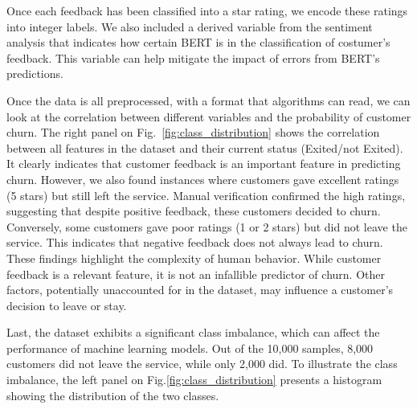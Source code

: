 \documentclass[12pt]{article}
\begin{document}
Once each feedback has been classified into a star rating, we encode these ratings into integer labels. We also included a derived variable from the sentiment analysis that indicates how certain BERT is in the classification of costumer's feedback. This variable can help mitigate the impact of errors from BERT's predictions.

Once the data is all preprocessed, with a format that algorithms can read, we can look at the correlation between different variables and the probability of customer churn. The right panel on Fig.~\ref{fig:class_distribution} shows the correlation between all features in the dataset and their current status (Exited/not Exited). It clearly indicates that customer feedback is an important feature in predicting churn. However, we also found instances where customers gave excellent ratings (5 stars) but still left the service. Manual verification confirmed the high ratings, suggesting that despite positive feedback, these customers decided to churn. Conversely, some customers gave poor ratings (1 or 2 stars) but did not leave the service. This indicates that negative feedback does not always lead to churn. These findings highlight the complexity of human behavior. While customer feedback is a relevant feature, it is not an infallible predictor of churn. Other factors, potentially unaccounted for in the dataset, may influence a customer's decision to leave or stay. 

Last, the dataset exhibits a significant class imbalance, which can affect the performance of machine learning models. Out of the 10,000 samples, 8,000 customers did not leave the service, while only 2,000 did. To illustrate the class imbalance, the left panel on Fig.\ref{fig:class_distribution} presents a histogram showing the distribution of the two classes.
\end{document}
